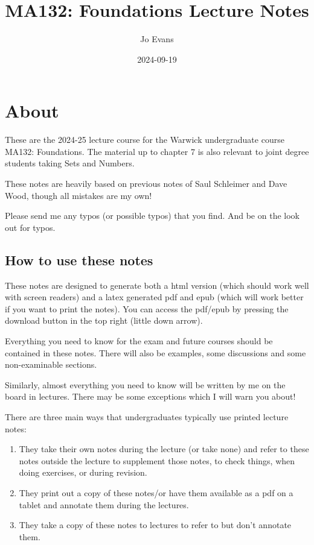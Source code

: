 \documentclass[
]{book}
\title{MA132: Foundations Lecture Notes}
\author{Jo Evans}
\date{2024-09-19}
\theoremstyle{definition}
\theoremstyle{definition}
\theoremstyle{definition}
\theoremstyle{definition}
\theoremstyle{remark}
\begin{document}
\maketitle

{
\setcounter{tocdepth}{1}
\tableofcontents
}
\chapter{About}\label{about}

These are the 2024-25 lecture course for the Warwick undergraduate course MA132: Foundations. The material up to chapter 7 is also relevant to joint degree students taking Sets and Numbers.

These notes are heavily based on previous notes of Saul Schleimer and Dave Wood, though all mistakes are my own!

Please send me any typos (or possible typos) that you find. And be on the look out for typos.

\section{How to use these notes}\label{how-to-use-these-notes}

These notes are designed to generate both a html version (which should work well with screen readers) and a latex generated pdf and epub (which will work better if you want to print the notes). You can access the pdf/epub by pressing the download button in the top right (little down arrow).

Everything you need to know for the exam and future courses should be contained in these notes. There will also be examples, some discussions and some non-examinable sections.

Similarly, almost everything you need to know will be written by me on the board in lectures. There may be some exceptions which I will warn you about!

There are three main ways that undergraduates typically use printed lecture notes:

\begin{enumerate}
\def\labelenumi{\arabic{enumi}.}
\item
  They take their own notes during the lecture (or take none) and refer to these notes outside the lecture to supplement those notes, to check things, when doing exercises, or during revision.
\item
  They print out a copy of these notes/or have them available as a pdf on a tablet and annotate them during the lectures.
\item
  They take a copy of these notes to lectures to refer to but don't annotate them.
\end{enumerate}
\end{document}
